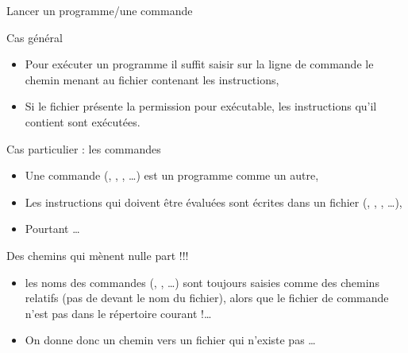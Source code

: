 \begin{frame}{Lancer un programme/une commande}
  \begin{block}{Cas général}
    \begin{itemize}
    \item Pour exécuter un programme il suffit saisir sur la ligne de commande
      le chemin menant au fichier contenant les instructions,
    \item Si le fichier présente la permission  pour exécutable, les
      instructions qu'il contient sont exécutées.
    \end{itemize}
  \end{block}
  \begin{block}{Cas particulier : les commandes}
    \begin{itemize}
    \item Une commande (, , , \dots) est un
      programme comme un autre,
    \item Les instructions qui doivent être évaluées sont écrites dans un
      fichier (, ,
      , \dots),
    \item Pourtant \dots
    \end{itemize}
  \end{block}
  \begin{alertblock}{Des chemins qui mènent nulle part !!!}
    \begin{itemize}
    \item les noms des commandes (, ,  \dots)
      sont toujours saisies comme des chemins relatifs (pas de 
      devant le nom du fichier), alors que le fichier de commande n'est pas
      dans le répertoire courant !\dots
    \item On donne donc un chemin vers un fichier qui n'existe pas \dots
    \end{itemize}
  \end{alertblock}
\end{frame}

